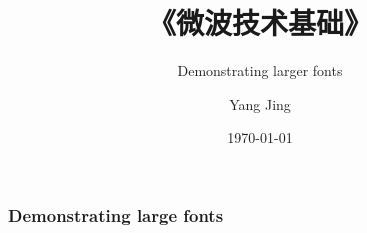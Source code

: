 \documentclass[17pt]{ctexbeamer}
\title[About Microwave]{《微波技术基础》}
\subtitle{Demonstrating larger fonts}
\author{Yang Jing\inst{1}}
\institute[HFNU]
{
    \inst{1}%
    Sch.EIEE \\
    Hefei Normal University \\
}
\date{\today}
\begin{document}
\frame{\titlepage}
\begin{frame}
    \frametitle{Demonstrating large fonts}
\end{frame}
\end{document}
